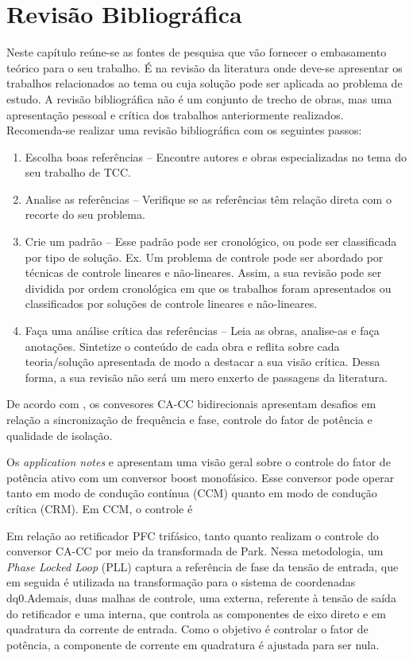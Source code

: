 \chapter{Revisão Bibliográfica}
Neste capítulo reúne-se as fontes de pesquisa que vão fornecer o embasamento teórico para o seu
trabalho. É na revisão da literatura onde deve-se apresentar os trabalhos relacionados ao tema
ou cuja solução pode ser aplicada ao problema de estudo. A revisão bibliográfica não é um
conjunto de trecho de obras, mas uma apresentação pessoal e crítica dos trabalhos anteriormente
realizados. Recomenda-se realizar uma revisão bibliográfica com os seguintes passos:
\begin{enumerate}
	\item Escolha boas referências – Encontre autores e obras especializadas no tema do seu trabalho de
	      TCC.
	\item Analise as referências – Verifique se as referências têm relação direta com o recorte do seu
	      problema.
	\item Crie um padrão – Esse padrão pode ser cronológico, ou pode ser classificada por tipo de
	      solução. Ex. Um problema de controle pode ser abordado por técnicas de controle lineares e
	      não-lineares. Assim, a sua revisão pode ser dividida por ordem cronológica em que os trabalhos
	      foram apresentados ou classificados por soluções de controle lineares e não-lineares.
	\item Faça uma análise crítica das referências – Leia as obras, analise-as e faça anotações.
	      Sintetize o conteúdo de cada obra e reflita sobre cada teoria/solução apresentada de modo a
	      destacar a sua visão crítica. Dessa forma, a sua revisão não será um mero enxerto de passagens
	      da literatura.
\end{enumerate}

De acordo com \cite{Kumar:2021}, os convesores CA-CC bidirecionais apresentam desafios em
relação a sincronização de frequência e fase, controle do fator de potência e qualidade de
isolação.

Os \textit{application notes} \cite{} e \cite{} apresentam uma visão geral sobre o controle do
fator de potência ativo com um conversor boost monofásico. Esse conversor pode operar tanto em
modo de condução contínua (CCM) quanto em modo de condução crítica (CRM). Em CCM, o controle é

Em relação ao retificador PFC trifásico, tanto \cite{3phPlecs} quanto \cite{WANG2013/03}
realizam o controle do conversor CA-CC por meio da transformada de Park. Nessa metodologia, um
\textit{Phase Locked Loop} (PLL) captura a referência de fase da tensão de entrada, que em
seguida é utilizada na transformação para o sistema de coordenadas dq0.Ademais, duas malhas de
controle, uma externa, referente à tensão de saída do retificador e uma interna, que controla
as componentes de eixo direto e em quadratura da corrente de entrada. Como o objetivo é
controlar o fator de potência, a componente de corrente em quadratura é ajustada para ser nula.

